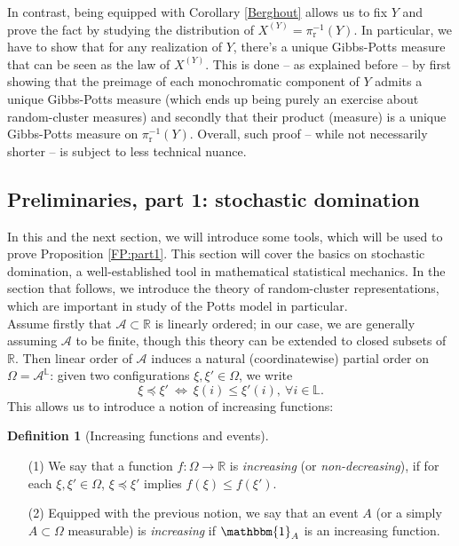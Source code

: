 \documentclass[12pt]{article}
\newcommand{\A}{\mathcal{A}}
\renewcommand{\L}{\mathbb{L}}
\newcommand{\R}{\mathbb{R}}
\renewcommand{\r}{\mathrm{r}}
\newcommand{\ra}{\rightarrow}
\newcommand{\1}{\mathbbm{1}}
\newcommand{\5}{\vspace{0.5cm}}
\theoremstyle{definition}
\newtheorem{df}[thm]{Definition}
\begin{document}
In contrast, being equipped with Corollary \ref{Berghout} allows us to fix $Y$ and prove the fact by studying the distribution of $X^{(Y)}=\pi_\r^{-1}(Y)$. In particular, we have to show that for any realization of $Y$, there's a unique Gibbs-Potts measure that can be seen as the law of $X^{(Y)}$. This is done -- as explained before -- by first showing that the preimage of each monochromatic component of $Y$ admits a unique Gibbs-Potts measure (which ends up being purely an exercise about random-cluster measures) and secondly that their product (measure) is a unique Gibbs-Potts measure on $\pi_\r^{-1}(Y)$. Overall, such proof -- while not necessarily shorter -- is subject to less technical nuance.


\subsection{Preliminaries, part 1: stochastic domination}

In this and the next section, we will introduce some tools, which will be used to prove Proposition \ref{FP:part1}. This section will cover the basics on stochastic domination, a well-established tool in mathematical statistical mechanics. In the section that follows, we introduce the theory of random-cluster representations, which are important in study of the Potts model in particular. \\

Assume firstly that $\A\subset\R$ is linearly ordered; in our case, we are generally assuming $\A$ to be finite, though this theory can be extended to closed subsets of $\R$. Then linear order of $\A$ induces a natural (coordinatewise) partial order on $\Omega=\A^\L$: given two configurations $\xi,\xi'\in\Omega$, we write
$$\xi\preceq\xi' ~\iff~ \xi(i)\leq\xi'(i),~\forall i\in\L.$$
This allows us to introduce a notion of increasing functions:

\begin{df}[Increasing functions and events]
~
\begin{itemize}
	\item[(1)] We say that a function $f:\Omega\ra\R$ is \textit{increasing} (or \textit{non-decreasing}), if for each $\xi,\xi'\in\Omega$, $\xi\preceq\xi'$ implies $f(\xi)\leq f(\xi')$. 
	\item[(2)] Equipped with the previous notion, we say that an event $A$ (or a simply $A\subset\Omega$ measurable) is \textit{increasing} if $\1_A$ is an increasing function.
\end{itemize}
\end{df}
\end{document}
